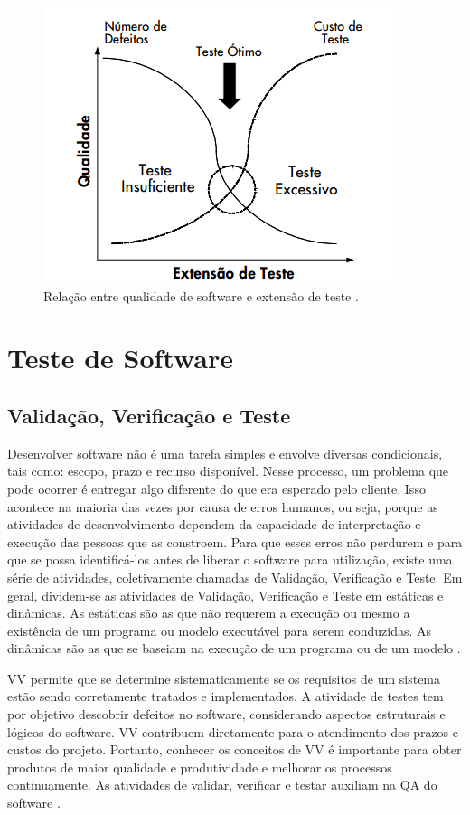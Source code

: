 \begin{figure}[!htb]
\centering
\includegraphics[width=.5\textwidth]{images/ETESTE.png}
\caption{Relação entre qualidade de software e extensão de teste \cite{HIRAMA2011}.}
\label{figure:ETESTE}
\end{figure}



\section{Teste de Software}\label{sec:testesdesoftware}

\subsection{Validação, Verificação e Teste}

Desenvolver software não é uma tarefa simples e envolve diversas condicionais, tais como: escopo, prazo e recurso disponível. Nesse processo, um problema que pode ocorrer é entregar algo diferente do que era esperado pelo cliente. Isso acontece na maioria das vezes por causa de erros humanos, ou seja, porque as atividades de desenvolvimento dependem da capacidade de interpretação e execução das pessoas que as constroem. Para que esses erros não perdurem e para que se possa identificá-los antes de liberar o software para utilização, existe uma série de atividades, coletivamente chamadas de Validação, Verificação e Teste. Em geral, dividem-se as atividades de Validação, Verificação e Teste em estáticas e dinâmicas. As estáticas são as que não requerem a execução ou mesmo a existência de um programa ou modelo executável para serem conduzidas. As dinâmicas são as que se baseiam na execução de um programa ou de um modelo \cite{DELAMARO2007}.

\ac{VV} permite que se determine sistematicamente se os requisitos de um sistema estão sendo corretamente tratados e implementados. A atividade de testes tem por objetivo descobrir defeitos no software, considerando aspectos estruturais e lógicos do software. \ac{VV} contribuem diretamente para o atendimento dos prazos e custos do projeto. Portanto, conhecer os conceitos de \ac{VV} é importante para obter produtos de maior qualidade e produtividade e melhorar os processos continuamente. As atividades de validar, verificar e testar auxiliam na \ac{QA} do software \cite{HIRAMA2011}.


